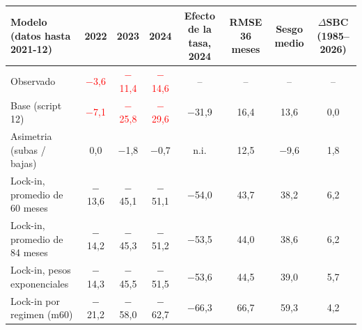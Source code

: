 \begin{tabular}{lccccccc}
\toprule
Modelo (datos hasta 2021-12) & 2022 & 2023 & 2024 & Efecto de la tasa, 2024 & RMSE 36 meses & Sesgo medio & $\Delta$SBC (1985--2026)
\\ \midrule
Observado & \textcolor{red}{\ensuremath{-}3{,}6} & \textcolor{red}{\ensuremath{-}11{,}4} & \textcolor{red}{\ensuremath{-}14{,}6} & -- & -- & -- & -- \\
Base (script 12) & \textcolor{red}{\ensuremath{-}7{,}1} & \textcolor{red}{\ensuremath{-}25{,}8} & \textcolor{red}{\ensuremath{-}29{,}6} & \ensuremath{-}31{,}9 & 16{,}4 & 13{,}6 & 0{,}0 \\
Asimetria (subas / bajas) & 0{,}0 & \ensuremath{-}1{,}8 & \ensuremath{-}0{,}7 & n.i. & 12{,}5 & \ensuremath{-}9{,}6 & 1{,}8 \\
Lock-in, promedio de 60 meses & \ensuremath{-}13{,}6 & \ensuremath{-}45{,}1 & \ensuremath{-}51{,}1 & \ensuremath{-}54{,}0 & 43{,}7 & 38{,}2 & 6{,}2 \\
Lock-in, promedio de 84 meses & \ensuremath{-}14{,}2 & \ensuremath{-}45{,}3 & \ensuremath{-}51{,}2 & \ensuremath{-}53{,}5 & 44{,}0 & 38{,}6 & 6{,}2 \\
Lock-in, pesos exponenciales & \ensuremath{-}14{,}3 & \ensuremath{-}45{,}5 & \ensuremath{-}51{,}5 & \ensuremath{-}53{,}6 & 44{,}5 & 39{,}0 & 5{,}7 \\
Lock-in por regimen (m60) & \ensuremath{-}21{,}2 & \ensuremath{-}58{,}0 & \ensuremath{-}62{,}7 & \ensuremath{-}66{,}3 & 66{,}7 & 59{,}3 & 4{,}2 \\
\bottomrule
\end{tabular}
